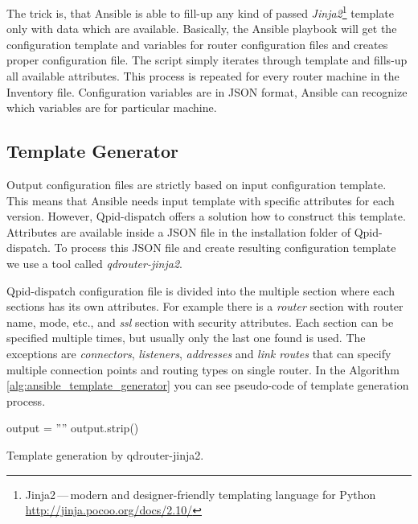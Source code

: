 The trick is, that Ansible is able to fill-up any kind of passed \emph{Jinja2}\footnote{Jinja2\,---\,modern and designer-friendly templating language for Python \url{http://jinja.pocoo.org/docs/2.10/}} template only with data which are available. Basically, the Ansible playbook will get the configuration template and variables for router configuration files and creates proper configuration file. The script simply iterates through template and fills-up all available attributes. This process is repeated for every router machine in the Inventory file. Configuration variables are in JSON format, Ansible can recognize which variables are for particular machine.

\subsection{Template Generator}
Output configuration files are strictly based on input configuration template. This means that Ansible needs input template with specific attributes for each version. However, Qpid-dispatch offers a solution how to construct this template. Attributes are available inside a JSON file in the installation folder of Qpid-dispatch. To process this JSON file and create resulting configuration template we use a tool called \emph{qdrouter-jinja2}\footnotemark{}.


Qpid-dispatch configuration file is divided into the multiple section where each sections has its own attributes. For example there is a \emph{router} section with router name, mode, etc., and \emph{ssl} section with security attributes. Each section can be specified multiple times, but usually only the last one found is used. The exceptions are \emph{connectors}, \emph{listeners}, \emph{addresses} and \emph{link routes} that can specify multiple connection points and routing types on single router. In the Algorithm \ref{alg:ansible_template_generator} you can see pseudo-code of template generation process.

\begin{center}
	\begin{algorithm}[H]
		\LinesNumbered
		\DontPrintSemicolon


		\var output = ''''\;
		output.strip()\;
		\caption{Template generation by qdrouter-jinja2.}
		\label{alg:ansible_template_generator}
	\end{algorithm}
\end{center}

